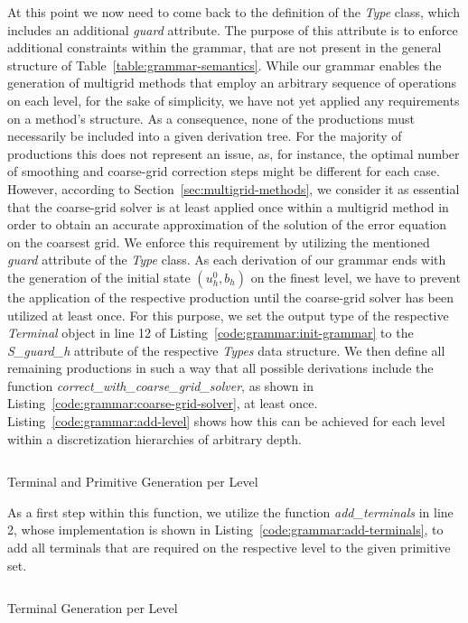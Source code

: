 At this point we now need to come back to the definition of the \emph{Type} class, which includes an additional \emph{guard} attribute.
The purpose of this attribute is to enforce additional constraints within the grammar, that are not present in the general structure of Table~\ref{table:grammar-semantics}.
While our grammar enables the generation of multigrid methods that employ an arbitrary sequence of operations on each level, for the sake of simplicity, we have not yet applied any requirements on a method's structure.
As a consequence, none of the productions must necessarily be included into a given derivation tree.
For the majority of productions this does not represent an issue, as, for instance, the optimal number of smoothing and coarse-grid correction steps might be different for each case.
However, according to Section~\ref{sec:multigrid-methods}, we consider it as essential that the coarse-grid solver is at least applied once within a multigrid method in order to obtain an accurate approximation of the solution of the error equation on the coarsest grid.
We enforce this requirement by utilizing the mentioned \emph{guard} attribute of the \emph{Type} class.
As each derivation of our grammar ends with the generation of the initial state $\left(u_h^0, b_h\right)$ on the finest level, we have to prevent the application of the respective production until the coarse-grid solver has been utilized at least once.
For this purpose, we set the output type of the respective \emph{Terminal} object in line 12 of Listing~\ref{code:grammar:init-grammar} to the \emph{S\_guard\_h} attribute of the respective \emph{Types} data structure.
We then define all remaining productions in such a way that all possible derivations include the function \emph{correct\_with\_coarse\_grid\_solver}, as shown in Listing~\ref{code:grammar:coarse-grid-solver}, at least once.
Listing~\ref{code:grammar:add-level} shows how this can be achieved for each level within a discretization hierarchies of arbitrary depth.
\begin{listing}
	\inputminted[linenos]{python}{evostencils/grammar/add_level.py}
	\caption{Terminal and Primitive Generation per Level}
	\label{code:grammar:add-level}
\end{listing}
As a first step within this function, we utilize the function \emph{add\_terminals} in line 2, whose implementation is shown in Listing~\ref{code:grammar:add-terminals}, to add all terminals that are required on the respective level to the given primitive set.
\begin{listing}
	\inputminted[linenos]{python}{evostencils/grammar/add_terminals.py}
	\caption{Terminal Generation per Level}
	\label{code:grammar:add-terminals}
\end{listing}
